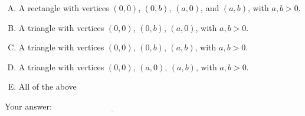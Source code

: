 \documentclass[10pt]{amsart}
\begin{document}
\begin{enumerate}
  \begin{enumerate}[(A)]
  \item A rectangle with vertices $(0,0)$, $(0,b)$, $(a,0)$, and
    $(a,b)$, with $a,b > 0$.
  \item A triangle with vertices $(0,0)$, $(0,b)$, $(a,0)$, with $a, b
    > 0$.
  \item A triangle with vertices $(0,0)$, $(0,b)$, $(a,b)$, with $a, b
    > 0$.
  \item A triangle with vertices $(0,0)$, $(a,0)$, $(a,b)$, with $a, b
    > 0$.
  \item All of the above
  \end{enumerate}

  \vspace{0.1in}
  Your answer: $\underline{\qquad\qquad\qquad\qquad\qquad\qquad\qquad}$
  \vspace{0.15in}

\end{enumerate}
\end{document}
